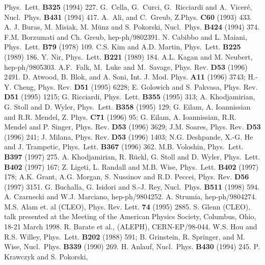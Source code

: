 \begin{thebibliography}{999}
{ Phys.~Lett.} {\bf B325} (1994) 227.
{ G.~Cella, G.~Curci, G.~Ricciardi and A.~Vicer{\'e},}
{ Nucl.~Phys.} {\bf B431} (1994) 417.
{ A.~Ali, and  C.~Greub,} { Z.Phys.} {\bf C60} (1993) 433.  
{ A. J. Buras, M. Misiak, M. M{\"u}nz and S. Pokorski,}
{ Nucl.~Phys.} {\bf B424} (1994) 374.
F.M. Borzumati and Ch. Greub, hep-ph/9802391.
{ N. Cabibbo and L. Maiani}, 
{ Phys.~Lett.} {\bf B79} (1978) 109.
{ C.S. Kim and A.D. Martin},
{ Phys.~Lett.} {\bf B225} (1989) 186.
{ Y. Nir,}
{ Phys.~Lett.} {\bf B221} (1989) 184.
A.L. Kagan and M. Neubert, hep-ph/9805303.
{ A.F.~Falk, M.~Luke and M.~Savage,}
{ Phys. Rev.} {\bf D53} (1996) 2491.
{ D. Atwood, B. Blok, and A. Soni}, 
{ Int. J. Mod. Phys.} {\bf A11} (1996) 3743;
{ H.-Y. Cheng,} { Phys. Rev.} {\bf D51} (1995) 6228;
{ E. Golowich and S. Pakvasa,} { Phys. Rev.} {\bf D51} (1995) 1215;
{ G. Ricciardi}, { Phys.~Lett.} {\bf B355} (1995) 313;
{ A. Khodjamirian, G. Stoll and D. Wyler},
{ Phys.~Lett.} {\bf B358} (1995) 129;
{ G. Eilam, A. Ioannissian and R.R. Mendel}, 
{ Z. Phys.} {\bf C71} (1996) 95;
{ G. Eilam, A. Ioannissian, R.R. Mendel and P. Singer},
 { Phys. Rev.} {\bf D53} (1996) 3629;
{ J.M. Soares,} { Phys. Rev.} {\bf D53} (1996) 241;
{ J. Milana,} { Phys. Rev.} {\bf D53} (1996) 1403;
{ N.G. Deshpande, X.-G. He and J. Trampetic,}
{ Phys.~Lett.} {\bf B367} (1996) 362.
{ M.B. Voloshin}, { Phys.~Lett.} {\bf B397} (1997) 275.
{ A. Khodjamirian, R. R\"uckl, G. Stoll and D. Wyler},
{ Phys.~Lett.} {\bf B402} (1997) 167;
{ Z. Ligeti, L. Randall and M.B. Wise}, 
{ Phys.~Lett.} {\bf B402} (1997) 178;
{ A.K. Grant, A.G. Morgan, S. Nussinov and R.D. Peccei},
 { Phys. Rev.} {\bf D56} (1997) 3151.
G. Buchalla, G. Isidori and S.-J. Rey, 
{ Nucl.~Phys.} {\bf B511} (1998) 594.
A. Czarnecki and W.J. Marciano, hep-ph/9804252.
A. Strumia, hep-ph/9804274. 
 { M.S. Alam} { et. al} (CLEO), 
{ Phys. Rev. Lett.} {\bf 74} (1995) 2885.
S. Glenn (CLEO), talk presented at the Meeting of the American Physics
Society, Columbus, Ohio, 18-21 March 1998.
R. Barate et al., (ALEPH), CERN-EP/98-044.
W.S. Hou and R.S. Willey, { Phys.~Lett.} {\bf B202} (1988) 591; 
B. Grinstein, R. Springer, and M. Wise, 
{ Nucl.~Phys.} {\bf B339} (1990) 269. 
H. Anlauf, { Nucl.~Phys.} {\bf B430} (1994) 245.
P. Krawczyk and S. Pokorski, 

\end{thebibliography}
